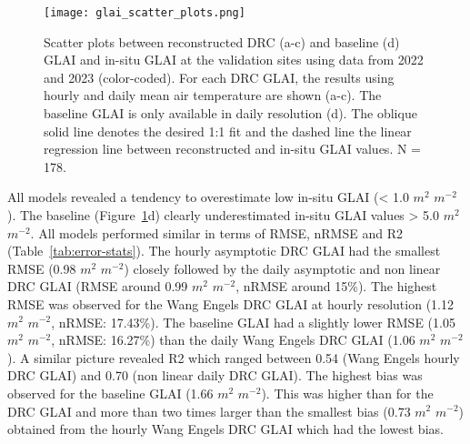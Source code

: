\begin{figure}[H]
    \centering
    \texttt{[image: glai\_scatter\_plots.png]}
    \caption{Scatter plots between reconstructed \gls{DRC} (a-c) and baseline (d) \gls{GLAI} and in-situ \gls{GLAI} at the validation sites using data from 2022 and 2023 (color-coded). For each \gls{DRC} \gls{GLAI}, the results using hourly and daily mean air temperature are shown (a-c). The baseline \gls{GLAI} is only available in daily resolution (d). The oblique solid line denotes the desired 1:1 fit and the dashed line the linear regression line between reconstructed and in-situ \gls{GLAI} values. N = 178.}
    \label{fig:glai-scatter-plots}
\end{figure}

All models revealed a tendency to overestimate low in-situ \gls{GLAI} (< 1.0 $m^2$ $m^{-2}$). The baseline (Figure~\ref{fig:glai-scatter-plots}d) clearly underestimated in-situ \gls{GLAI} values > 5.0 $m^2$ $m^{-2}$. All models performed similar in terms of \gls{RMSE}, \gls{nRMSE} and \gls{R2} (Table~\ref{tab:error-stats}). The hourly asymptotic \gls{DRC} \gls{GLAI} had the smallest \gls{RMSE} (0.98 $m^2$ $m^{-2}$) closely followed by the daily asymptotic and non linear \gls{DRC} \gls{GLAI} (\gls{RMSE} around 0.99  $m^2$ $m^{-2}$, \gls{nRMSE} around 15\%). The highest \gls{RMSE} was observed for the Wang Engels \gls{DRC} \gls{GLAI} at hourly resolution (1.12  $m^2$ $m^{-2}$, \gls{nRMSE}: 17.43\%). The baseline \gls{GLAI} had a slightly lower \gls{RMSE} (1.05  $m^2$ $m^{-2}$, \gls{nRMSE}: 16.27\%) than the daily Wang Engels \gls{DRC} \gls{GLAI} (1.06  $m^2$ $m^{-2}$). A similar picture revealed \gls{R2} which ranged between 0.54 (Wang Engels hourly \gls{DRC} \gls{GLAI}) and 0.70 (non linear daily \gls{DRC} \gls{GLAI}). The highest bias was observed for the baseline \gls{GLAI} (1.66  $m^2$ $m^{-2}$). This was higher than for the \gls{DRC} \gls{GLAI} and more than two times larger than the smallest bias (0.73  $m^2$ $m^{-2}$) obtained from the hourly Wang Engels \gls{DRC} \gls{GLAI} which had the lowest bias.

